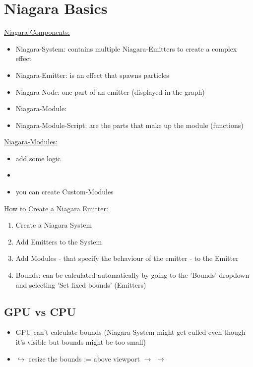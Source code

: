     \section{Niagara Basics}
            \uline{Niagara Components:}
            \begin{itemize}
                \item Niagara-System: contains multiple Niagara-Emitters to create a complex effect
                \item Niagara-Emitter: is an effect that spawns particles
                \item Niagara-Node: one part of an emitter (displayed in the graph)
                \item Niagara-Module: 
                \item Niagara-Module-Script: are the parts that make up the module (functions)
            \end{itemize}
            \uline{Niagara-Modules:}
            \begin{itemize}
                \item add some logic
                \item 
                \item you can create Custom-Modules
            \end{itemize}
            \uline{How to Create a Niagara Emitter:}
            \begin{enumerate}
                \item Create a Niagara System
                \item Add Emitters to the System
                \item Add Modules - that specify the behaviour of the emitter - to the Emitter
                \item Bounds: can be calculated automatically by going to the 'Bounds' dropdown and selecting 'Set fixed bounds' (Emitters)
            \end{enumerate}

        \subsection{GPU vs CPU}
                \begin{itemize}
                    \item GPU can't calculate bounds (Niagara-System might get culled even though it's visible but bounds might be too small)
                    \item $\hookrightarrow$ resize the bounds := above viewport  $\rightarrow$  $\rightarrow$ 
                \end{itemize}
            
